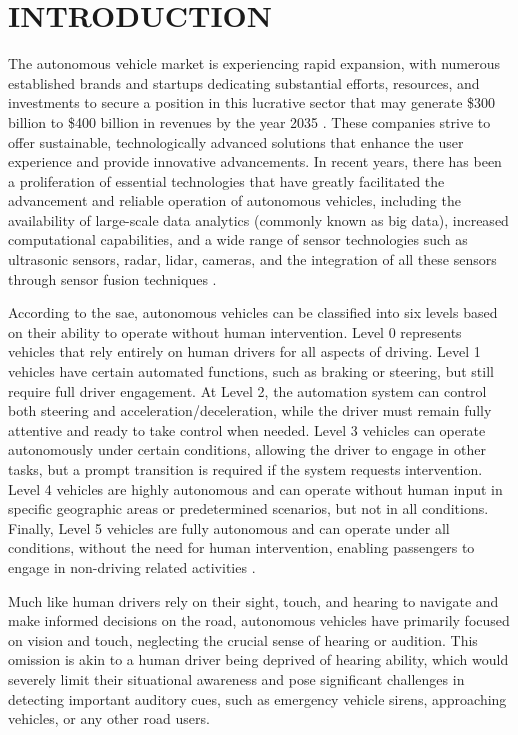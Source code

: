     \chapter{INTRODUCTION}
\label{chp:introduction}

The autonomous vehicle market is experiencing rapid expansion, with numerous established brands and startups dedicating substantial efforts, resources, and investments to secure a position in this lucrative sector that may generate \$300 billion to \$400 billion in revenues by the year 2035 \cite{McKinsey2023}. These companies strive to offer sustainable, technologically advanced solutions that enhance the user experience and provide innovative advancements. In recent years, there has been a proliferation of essential technologies that have greatly facilitated the advancement and reliable operation of autonomous vehicles, including the availability of large-scale data analytics (commonly known as big data), increased computational capabilities, and a wide range of sensor technologies such as ultrasonic sensors, \gls{radar}, \gls{lidar}, cameras, and the integration of all these sensors through sensor fusion techniques \cite{Hussainj2018}.

According to the \gls{sae}, autonomous vehicles can be classified into six levels based on their ability to operate without human intervention. Level 0 represents vehicles that rely entirely on human drivers for all aspects of driving. Level 1 vehicles have certain automated functions, such as braking or steering, but still require full driver engagement. At Level 2, the automation system can control both steering and acceleration/deceleration, while the driver must remain fully attentive and ready to take control when needed. Level 3 vehicles can operate autonomously under certain conditions, allowing the driver to engage in other tasks, but a prompt transition is required if the system requests intervention. Level 4 vehicles are highly autonomous and can operate without human input in specific geographic areas or predetermined scenarios, but not in all conditions. Finally, Level 5 vehicles are fully autonomous and can operate under all conditions, without the need for human intervention, enabling passengers to engage in non-driving related activities \cite{SAE2021}.

Much like human drivers rely on their sight, touch, and hearing to navigate and make informed decisions on the road, autonomous vehicles have primarily focused on vision and touch, neglecting the crucial sense of hearing or audition. This omission is akin to a human driver being deprived of hearing ability, which would severely limit their situational awareness and pose significant challenges in detecting important auditory cues, such as emergency vehicle sirens, approaching vehicles, or any other road users.

